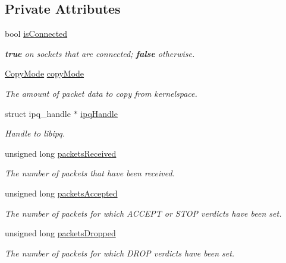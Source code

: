 \subsection*{\-Private \-Attributes}
\begin{DoxyCompactItemize}
\item 
bool \hyperlink{classIPQ_1_1IpqSocket_a5f17c2492bd9205c4120e8dbeec652d2}{is\-Connected}
\begin{DoxyCompactList}\small\item\em {\bfseries true} on sockets that are connected; {\bfseries false} otherwise. \end{DoxyCompactList}\item 
\hyperlink{classIPQ_1_1IpqSocket_afee6d75480079906ecf6544f8467e0cc}{\-Copy\-Mode} \hyperlink{classIPQ_1_1IpqSocket_adef58e75a6d67b6179ff73b59ff49eeb}{copy\-Mode}
\begin{DoxyCompactList}\small\item\em \-The amount of packet data to copy from kernelspace. \end{DoxyCompactList}\item 
struct ipq\-\_\-handle $\ast$ \hyperlink{classIPQ_1_1IpqSocket_ad4d1b18fe03e035fb76f6bcd6eaa32cb}{ipq\-Handle}
\begin{DoxyCompactList}\small\item\em \-Handle to libipq. \end{DoxyCompactList}\item 
unsigned long \hyperlink{classIPQ_1_1IpqSocket_a85d2411c577e4bec30b15d3ec43a21f0}{packets\-Received}
\begin{DoxyCompactList}\small\item\em \-The number of packets that have been received. \end{DoxyCompactList}\item 
unsigned long \hyperlink{classIPQ_1_1IpqSocket_a50304942c2b695fecdb496d6d424937a}{packets\-Accepted}
\begin{DoxyCompactList}\small\item\em \-The number of packets for which \-A\-C\-C\-E\-P\-T or \-S\-T\-O\-P verdicts have been set. \end{DoxyCompactList}\item 
unsigned long \hyperlink{classIPQ_1_1IpqSocket_acc24abac49471076d9555f58afb0d162}{packets\-Dropped}
\begin{DoxyCompactList}\small\item\em \-The number of packets for which \-D\-R\-O\-P verdicts have been set. \end{DoxyCompactList}\end{DoxyCompactItemize}


